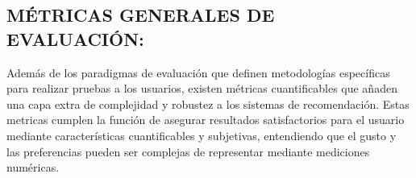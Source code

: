 \newpage
\thispagestyle{plain}
\vspace*{0.2cm}

\subsection{MÉTRICAS GENERALES DE EVALUACIÓN: }

Además de los paradigmas de evaluación que definen metodologías específicas para realizar pruebas a los usuarios, existen métricas cuantificables que añaden una capa extra de complejidad y robustez a los sistemas de recomendación. Estas metricas cumplen la función de asegurar resultados satisfactorios para el usuario mediante características cuantificables y subjetivas, entendiendo que el gusto y las preferencias pueden ser complejas de representar mediante mediciones numéricas.

